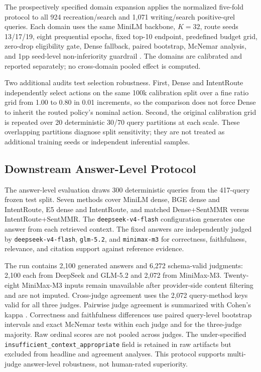 The prospectively specified domain expansion applies the normalized five-fold protocol to all 924 recreation/search and 1,071 writing/search positive-qrel queries. Each domain uses the same MiniLM backbone, $K=32$, route seeds 13/17/19, eight prequential epochs, fixed top-10 endpoint, predefined budget grid, zero-drop eligibility gate, Dense fallback, paired bootstrap, McNemar analysis, and 1pp seed-level non-inferiority guardrail \citep{mcnemar1947}. The domains are calibrated and reported separately; no cross-domain pooled effect is computed.

Two additional audits test selection robustness. First, Dense and IntentRoute independently select actions on the same 100k calibration split over a fine ratio grid from 1.00 to 0.80 in 0.01 increments, so the comparison does not force Dense to inherit the routed policy's nominal action. Second, the original calibration grid is repeated over 20 deterministic 30/70 query partitions at each scale. These overlapping partitions diagnose split sensitivity; they are not treated as additional training seeds or independent inferential samples.

\subsection{Downstream Answer-Level Protocol}
\label{sec:05-experimental-setup:downstream-answer-level-protocol}

The answer-level evaluation draws 300 deterministic queries from the 417-query frozen test split. Seven methods cover MiniLM dense, BGE dense and IntentRoute, E5 dense and IntentRoute, and matched Dense+SentMMR versus IntentRoute+SentMMR. The \nolinkurl{deepseek-v4-flash} configuration generates one answer from each retrieved context. The fixed answers are independently judged by \nolinkurl{deepseek-v4-flash}, \nolinkurl{glm-5.2}, and \nolinkurl{minimax-m3} for correctness, faithfulness, relevance, and citation support against reference evidence.

The run contains 2,100 generated answers and 6,272 schema-valid judgments: 2,100 each from DeepSeek and GLM-5.2 and 2,072 from MiniMax-M3. Twenty-eight MiniMax-M3 inputs remain unavailable after provider-side content filtering and are not imputed. Cross-judge agreement uses the 2,072 query-method keys valid for all three judges. Pairwise judge agreement is summarized with Cohen's kappa \citep{cohen1960kappa}. Correctness and faithfulness differences use paired query-level bootstrap intervals and exact McNemar tests within each judge and for the three-judge majority. Raw ordinal scores are not pooled across judges. The under-specified \nolinkurl{insufficient_context_appropriate} field is retained in raw artifacts but excluded from headline and agreement analyses. This protocol supports multi-judge answer-level robustness, not human-rated superiority.
